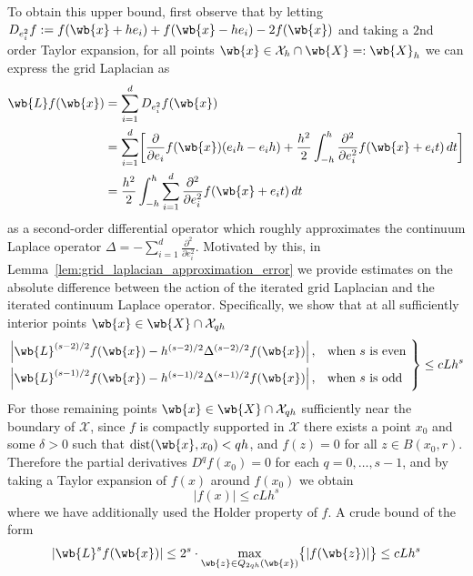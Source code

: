 \documentclass{article}
\newcommand{\abs}[1]{\left \lvert #1 \right \rvert}
\newcommand{\1}{\mathbf{1}}
\newcommand{\Xset}{\mathcal{X}}
\theoremstyle{alden}
\theoremstyle{aldenthm}
\theoremstyle{definition}
\theoremstyle{remark}
\begin{document}
To obtain this upper bound, first observe that by letting $D_{e_i^2}f := f(\wb{x} + he_i) + f(\wb{x} - he_i) - 2f(\wb{x})$ and taking a $2$nd order Taylor expansion, for all points $\wb{x} \in \Xset_{h} \cap \wb{X} =: \wb{X}_{h}$ we can express the grid Laplacian as
\begin{align}
\wb{L}f(\wb{x}) & = \sum_{i = 1}^{d} D_{e_i^2}f(\wb{x}) \nonumber \\
& = \sum_{i = 1}^{d} \biggl[\frac{\partial}{\partial e_i} f(\wb{x})(e_ih - e_ih) + \frac{h^2}{2} \int_{-h}^{h} \frac{\partial^2}{\partial e_i^2} f(\wb{x} + e_it) \,dt \biggr] \nonumber \\
& = \frac{h^2}{2} \int_{-h}^{h} \sum_{i = 1}^{d} \frac{\partial^2}{\partial e_i^2} f(\wb{x} + e_it) \,dt \label{eqn:grid_sobolev_norm_higher_order_pf1}
\end{align} 
as a second-order differential operator which roughly approximates the continuum Laplace operator $\Delta = -\sum_{i = 1}^{d} \frac{\partial^2}{\partial e_i^2}$. Motivated by this, in Lemma~\ref{lem:grid_laplacian_approximation_error} we provide estimates on the absolute difference between the action of the iterated grid Laplacian and the iterated continuum Laplace operator. Specifically, we show that at all sufficiently interior points $\wb{x} \in \wb{X} \cap \Xset_{qh}$ 
\begin{equation*}
\begin{rcases*}
\abs{\wb{L}^{(s - 2)/2}f(\wb{x}) - h^{(s - 2)/2}\Delta^{(s - 2)/2}f(\wb{x})}, &\textrm{when $s$ is even} \\
\abs{\wb{L}^{(s - 1)/2}f(\wb{x}) - h^{(s - 1)/2}\Delta^{(s - 1)/2}f(\wb{x})}, & \textrm{when $s$ is odd} \\
\end{rcases*}
\leq cLh^{s}
\end{equation*}
For those remaining points $\wb{x} \in \wb{X} \cap \Xset_{qh}$ sufficiently near the boundary of $\Xset$, since $f$ is compactly supported in $\Xset$ there exists a point $x_0$ and some $\delta > 0$ such that $\mathrm{dist}(\wb{x},x_0) < qh$, and $f(z) = 0$ for all $z \in B(x_0,r)$. Therefore the partial derivatives $D^qf(x_0) = 0$ for each $q = 0,\ldots,s - 1$, and by taking a Taylor expansion of $f(x)$ around $f(x_0)$ we obtain
\begin{equation*}
\abs{f(x)} \leq c L h^{s}
\end{equation*}
where we have additionally used the Holder property of $f$. A crude bound of the form
\begin{equation*}
\abs{\wb{L}^s f(\wb{x})} \leq 2^s \cdot \max_{\wb{z} \in Q_{2qh}(\wb{x})} \bigl\{\abs{f(\wb{z})} \bigr\} \leq c L h^{s}
\end{equation*}
\end{document}
